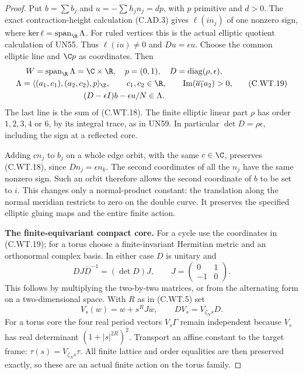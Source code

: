 \begin{proof}
Put \(b=\sum b_j\) and
\(u=-\sum h_jn_j=dp\), with \(p\)
primitive and \(d>0\). The exact
contraction-height calculation
(C.AD.3) gives
\(\ell(in_j)\) of one nonzero
sign, where
\(\ker\ell=\operatorname{span}_{\R}\Lambda\).
For ruled vertices this is the
actual elliptic quotient
calculation of UN55.
Thus \(\ell(iu)\ne0\) and
\(Du=\epsilon u\).
Choose the common elliptic
line and \(\C p\) as coordinates.
Then
\[
 \begin{gathered}
 W=\operatorname{span}_{\R}\Lambda=\C\times\R,\quad
 p=(0,1),\quad D=\operatorname{diag}(\rho,\epsilon),\\
 \Lambda=\langle(a_1,c_1),(a_2,c_2),p\rangle_{\Z},
 \qquad c_1,c_2\in\R,\qquad
        \operatorname{Im}(\overline{a_1}a_2)>0,\\
              (D-\epsilon I)b-\epsilon u/N\in\Lambda.
 \end{gathered}
 \tag{C.WT.19}
\]
The last line is the sum of
(C.WT.18). The finite elliptic
linear part \(\rho\) has order
\(1,2,3,4\) or \(6\), by its
integral trace, as in UN59.
In particular
\(\det D=\rho\epsilon\), including
the sign at a reflected core.

Adding \(c n_j\) to \(b_j\) on
a whole edge orbit, with the
same \(c\in\C\), preserves
(C.WT.18), since
\(Dn_j=\epsilon n_k\).
The second coordinates of all
the \(n_j\) have the same
nonzero sign. Such an orbit
therefore allows the second
coordinate of \(b\) to be
set to \(i\). This changes
only a normal-product constant:
the translation along the
normal meridian restricts
to zero on the double curve.
It preserves the specified
elliptic gluing maps and the
entire finite action.

\par\medskip\noindent\textbf{The finite-equivariant compact core.}
For a cycle use the coordinates
in (C.WT.19); for a torus choose
a finite-invariant Hermitian
metric and an orthonormal
complex basis. In either case
\(D\) is unitary and
\[
 D J\overline D^{-1}=(\det D)J,
       \qquad J=\begin{pmatrix}0&1\\-1&0\end{pmatrix}.
 \tag{C.WT.20}
\]
This follows by multiplying
the two-by-two matrices, or
from the alternating form
on a two-dimensional space.
With \(R\) as in (C.WT.5) set
\[
 V_s(w)=w+s^R J\overline w,\qquad
             D V_s=V_{\zeta_Ns}D .
 \tag{C.WT.21}
\]
For a torus core the four
real period vectors \(V_s\Gamma\)
remain independent because
\(V_s\) has real determinant
\((1+|s|^{2R})^2\).
Transport an affine constant
to the target frame:
\(\tau(s)=V_{\zeta_Ns}\tau\).
All finite lattice and order
equalities are then preserved
exactly, so these are an actual
finite action on the torus
family.


\end{proof}
